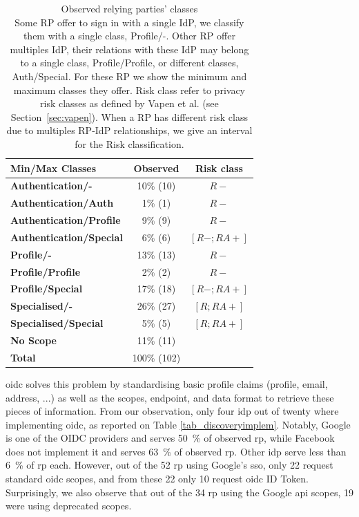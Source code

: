 \begin{table}
\centering
\begin{tabular}{@{}lcc@{}}\toprule\toprule
  \textbf{Min/Max Classes} & \textbf{Observed} & \textbf{Risk class}\\\midrule
  \textbf{Authentication/-} & 10\% (10) & $R-$\\
  \textbf{Authentication/Auth} & 1\% (1) & $R-$\\
  \textbf{Authentication/Profile} & 9\% (9) & $R-$\\
  \textbf{Authentication/Special} & 6\% (6) & $[R-;RA+]$\\\midrule
  \textbf{Profile/-} & 13\% (13) & $R-$\\
  \textbf{Profile/Profile} & 2\% (2) & $R-$\\
  \textbf{Profile/Special} & 17\% (18) &$[R-;RA+]$\\\midrule
  \textbf{Specialised/-} & 26\% (27) & $[R; RA+]$\\
  \textbf{Specialised/Special} & 5\% (5) & $[R; RA+]$\\\midrule
  \textbf{No Scope} & 11\% (11) & \\
  \textbf{Total} & 100\% (102) & \\\bottomrule
  \hline
\end{tabular}

\caption[Observed Relying Parties' Classes]{Observed relying parties' classes\\ Some RP offer to sign in with a single IdP, we classify them with a single class, \eg Profile/-. 
Other RP offer multiples IdP, their relations with these IdP may belong to a single class, \eg Profile/Profile, or different classes, \eg Auth/Special.
For these RP we show the minimum and maximum classes they offer.
Risk class refer to privacy risk classes as defined by Vapen et al. (see Section~\ref{sec:vapen}).
When a RP has different risk class due to multiples RP-IdP relationships, we give an interval for the Risk classification. }
\label{tab_class}
\end{table}

\gls{oidc} solves this problem by standardising basic profile claims (\eg profile, email, address, ...) as well as the scopes, endpoint, and data format to retrieve these pieces of information.
From our observation, only four \gls{idp} out of twenty where implementing \gls{oidc}, as reported on Table \ref{tab_discoveryimplem}.
Notably, Google is one of the OIDC providers and serves \SI{50}{\percent} of observed \gls{rp}, while Facebook does not implement it and serves \SI{63}{\percent} of observed \gls{rp}.
Other \gls{idp} serve less than \SI{6}{\percent} of \gls{rp} each.
However, out of the 52 \gls{rp} using Google's \gls{sso}, only 22 request standard \gls{oidc} scopes, and from these 22 only 10 request \gls{oidc} ID Token.
Surprisingly, we also observe that out of the 34 \gls{rp} using the Google \gls{api} scopes, 19 were using deprecated scopes.

